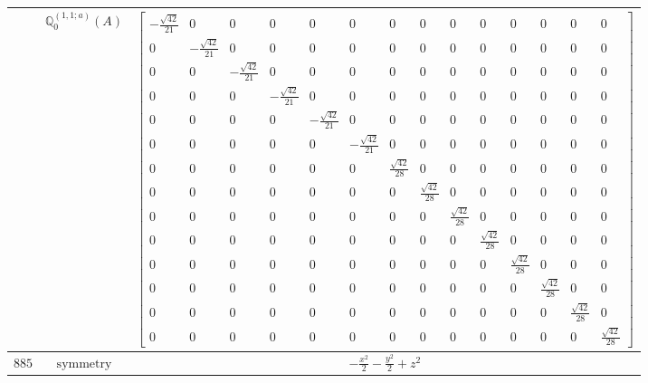 \documentclass[fleqn,8pt,landscape]{jsarticle}
\begin{document}
\begin{longtable}{ccc}
$  $ & $ \mathbb{Q}_{0}^{(1,1;a)}(A) $ & $ \begin{bmatrix} - \frac{\sqrt{42}}{21} & 0 & 0 & 0 & 0 & 0 & 0 & 0 & 0 & 0 & 0 & 0 & 0 & 0 \\ 0 & - \frac{\sqrt{42}}{21} & 0 & 0 & 0 & 0 & 0 & 0 & 0 & 0 & 0 & 0 & 0 & 0 \\ 0 & 0 & - \frac{\sqrt{42}}{21} & 0 & 0 & 0 & 0 & 0 & 0 & 0 & 0 & 0 & 0 & 0 \\ 0 & 0 & 0 & - \frac{\sqrt{42}}{21} & 0 & 0 & 0 & 0 & 0 & 0 & 0 & 0 & 0 & 0 \\ 0 & 0 & 0 & 0 & - \frac{\sqrt{42}}{21} & 0 & 0 & 0 & 0 & 0 & 0 & 0 & 0 & 0 \\ 0 & 0 & 0 & 0 & 0 & - \frac{\sqrt{42}}{21} & 0 & 0 & 0 & 0 & 0 & 0 & 0 & 0 \\ 0 & 0 & 0 & 0 & 0 & 0 & \frac{\sqrt{42}}{28} & 0 & 0 & 0 & 0 & 0 & 0 & 0 \\ 0 & 0 & 0 & 0 & 0 & 0 & 0 & \frac{\sqrt{42}}{28} & 0 & 0 & 0 & 0 & 0 & 0 \\ 0 & 0 & 0 & 0 & 0 & 0 & 0 & 0 & \frac{\sqrt{42}}{28} & 0 & 0 & 0 & 0 & 0 \\ 0 & 0 & 0 & 0 & 0 & 0 & 0 & 0 & 0 & \frac{\sqrt{42}}{28} & 0 & 0 & 0 & 0 \\ 0 & 0 & 0 & 0 & 0 & 0 & 0 & 0 & 0 & 0 & \frac{\sqrt{42}}{28} & 0 & 0 & 0 \\ 0 & 0 & 0 & 0 & 0 & 0 & 0 & 0 & 0 & 0 & 0 & \frac{\sqrt{42}}{28} & 0 & 0 \\ 0 & 0 & 0 & 0 & 0 & 0 & 0 & 0 & 0 & 0 & 0 & 0 & \frac{\sqrt{42}}{28} & 0 \\ 0 & 0 & 0 & 0 & 0 & 0 & 0 & 0 & 0 & 0 & 0 & 0 & 0 & \frac{\sqrt{42}}{28} \end{bmatrix} $ \\ \hline
$ 885 $ & $ \text{symmetry} $ & $ - \frac{x^{2}}{2} - \frac{y^{2}}{2} + z^{2} $ \\

\end{longtable}
\end{document}
